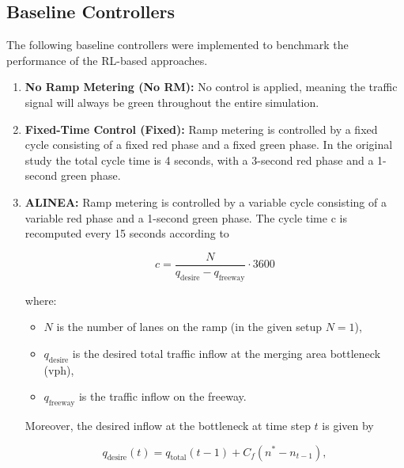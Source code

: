 \subsection{Baseline Controllers}

The following baseline controllers were implemented to benchmark the performance of the RL-based approaches.

\begin{enumerate}[itemsep=0.8em, leftmargin=1.5em]

    \item \textbf{No Ramp Metering (No RM):} No control is applied, meaning the traffic signal will always be green throughout the entire simulation.

    \item \textbf{Fixed-Time Control (Fixed):} Ramp metering is controlled by a fixed cycle consisting of a fixed red phase and a fixed green phase. In the original study the total cycle time is 4 seconds, with a 3-second red phase and a 1-second green phase.

    \item \textbf{ALINEA:} Ramp metering is controlled by a variable cycle consisting of a variable red phase and a 1-second green phase. The cycle time c is recomputed every 15 seconds according to

    \begin{equation}
        c = \frac{N}{q_{\text{desire}} - q_{\text{freeway}}} \cdot 3600
    \end{equation}

    where:

    \begin{itemize}[label={}, nosep, leftmargin=1em]
        \item $N$ is the number of lanes on the ramp (in the given setup $N = 1$),
        \item $q_{\text{desire}}$ is the desired total traffic inflow at the merging area bottleneck (vph),
        \item $q_{\text{freeway}}$ is the traffic inflow on the freeway.
    \end{itemize}

    \medskip
    Moreover, the desired inflow at the bottleneck at time step $t$ is given by

    \begin{equation}
        q_{\text{desire}}(t) = q_{\text{total}}(t-1) + C_f(n^* - n_{t-1}),
    \end{equation}


\end{enumerate}
